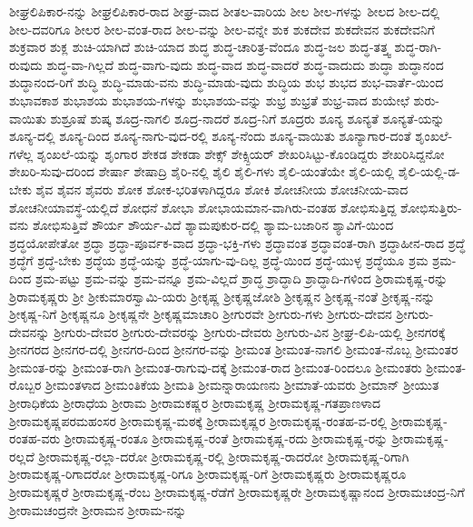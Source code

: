 {ಶೀಘ್ರಲಿಪಿಕಾರ-ನನ್ನು
ಶೀಘ್ರಲಿಪಿಕಾರ-ರಾದ
ಶೀಘ್ರ-ವಾದ
ಶೀತಲ-ವಾರಿಯ
ಶೀಲ
ಶೀಲ-ಗಳನ್ನು
ಶೀಲದ
ಶೀಲ-ದಲ್ಲಿ
ಶೀಲ-ದವರಿಗೂ
ಶೀಲರ
ಶೀಲ-ವಂತ-ರಾದ
ಶೀಲ-ವನ್ನು
ಶೀಲ-ವನ್ನೇ
ಶುಕ
ಶುಕದೇವ
ಶುಕದೇವನ
ಶುಕದೇವನಿಗೆ
ಶುಕ್ರವಾರ
ಶುಕ್ಲ
ಶುಚಿ-ಯಾಗಿದೆ
ಶುಚಿ-ಯಾದ
ಶುದ್ಧ
ಶುದ್ಧ-ಚಾರಿತ್ರ-ವೆಂದೂ
ಶುದ್ಧ-ಜಲ
ಶುದ್ಧ-ತತ್ತ್ವ
ಶುದ್ಧ-ರಾಗಿ-ರುವುದು
ಶುದ್ಧ-ವಾ-ಗಿಲ್ಲದೆ
ಶುದ್ಧ-ವಾಗು-ವುದು
ಶುದ್ಧ-ವಾದ
ಶುದ್ಧ-ವಾದರೆ
ಶುದ್ಧ-ವಾದುದು
ಶುದ್ಧಾ
ಶುದ್ಧಾನಂದ
ಶುದ್ಧಾನಂದ-ರಿಗೆ
ಶುದ್ಧಿ
ಶುದ್ಧಿ-ಮಾಡು-ವನು
ಶುದ್ಧಿ-ಮಾಡು-ವುದು
ಶುದ್ಧಿಯ
ಶುಭ
ಶುಭದ
ಶುಭ-ವಾರ್ತೆ-ಯಿಂದ
ಶುಭಾವಕಾಶ
ಶುಭಾಶಯ
ಶುಭಾಶಯ-ಗಳನ್ನು
ಶುಭಾಶಯ-ವನ್ನು
ಶುಭ್ರ
ಶುಭ್ರತೆ
ಶುಭ್ರ-ವಾದ
ಶುಯೇಛೆ
ಶುರು-ವಾಯಿತು
ಶುಶ್ರೂಷೆ
ಶುಷ್ಕ
ಶೂದ್ರ-ನಾಗಲಿ
ಶೂದ್ರ-ನಾದರೆ
ಶೂದ್ರ-ನಿಗೆ
ಶೂದ್ರರು
ಶೂನ್ಯ
ಶೂನ್ಯತೆ
ಶೂನ್ಯತೆ-ಯನ್ನು
ಶೂನ್ಯ-ದಲ್ಲಿ
ಶೂನ್ಯ-ದಿಂದ
ಶೂನ್ಯ-ನಾಗು-ವುದ-ರಲ್ಲಿ
ಶೂನ್ಯ-ನೆಂದು
ಶೂನ್ಯ-ವಾಯಿತು
ಶೂನ್ಯಾಗಾರ-ದಂತೆ
ಶೃಂಖಲೆ-ಗಳೆಲ್ಲ
ಶೃಂಖಲೆ-ಯನ್ನು
ಶೃಂಗಾರ
ಶೇಕಡ
ಶೇಕಡಾ
ಶೇಕ್ಸ್
ಶೇಕ್ಸ್ಪಿಯರ್
ಶೇಖರಿಸಿಟ್ಟು-ಕೊಂಡಿದ್ದರು
ಶೇಖರಿಸಿದ್ದನೋ
ಶೇಖರಿ-ಸುವು-ದರಿಂದ
ಶೇರ್ಷಾ
ಶೇಷಾದ್ರಿ
ಶೈರಿ-ನಲ್ಲಿ
ಶೈಲಿ
ಶೈಲಿ-ಗಳು
ಶೈಲಿ-ಯಂತೆಯೇ
ಶೈಲಿ-ಯಲ್ಲಿ
ಶೈಲಿ-ಯಲ್ಲಿ-ಡ-ಬೇಕು
ಶೈವ
ಶೈವನ
ಶೈವರು
ಶೋಕ
ಶೋಕ-ಭರಿತಳಾಗಿದ್ದರೂ
ಶೋಕಿ
ಶೋಚನೀಯ
ಶೋಚನೀಯ-ವಾದ
ಶೋಚನೀಯಾವಸ್ಥೆ-ಯಲ್ಲಿದೆ
ಶೋಧನೆ
ಶೋಭಾ
ಶೋಭಾಯಮಾನ-ವಾಗಿರು-ವಂತಹ
ಶೋಭಿಸುತ್ತಿದ್ದ
ಶೋಭಿಸುತ್ತಿರು-ವನು
ಶೋಭಿಸುತ್ತಿವೆ
ಶೌರ್ಯ
ಶೌರ್ಯ-ವಿದೆ
ಶ್ಯಾಮಪುಕುರ-ದಲ್ಲಿ
ಶ್ಯಾಮ-ಬಜಾರಿನ
ಶ್ಯಾವಿಗೆ-ಯಿಂದ
ಶ್ರದ್ಧಯೋಪೇತೋ
ಶ್ರದ್ಧಾ
ಶ್ರದ್ಧಾ-ಪೂರ್ವಕ-ವಾದ
ಶ್ರದ್ಧಾ-ಭಕ್ತಿ-ಗಳು
ಶ್ರದ್ಧಾವಂತ
ಶ್ರದ್ಧಾವಂತ-ರಾಗಿ
ಶ್ರದ್ಧಾಹೀನ-ರಾದ
ಶ್ರದ್ಧೆ
ಶ್ರದ್ಧೆಗೆ
ಶ್ರದ್ಧೆ-ಬೇಕು
ಶ್ರದ್ಧೆಯ
ಶ್ರದ್ಧೆ-ಯನ್ನು
ಶ್ರದ್ಧೆ-ಯಾಗು-ವು-ದಿಲ್ಲ
ಶ್ರದ್ಧೆ-ಯಿಂದ
ಶ್ರದ್ಧೆ-ಯುಳ್ಳ
ಶ್ರದ್ಧೆಯೂ
ಶ್ರಮ
ಶ್ರಮ-ದಿಂದ
ಶ್ರಮ-ಪಟ್ಟು
ಶ್ರಮ-ವನ್ನು
ಶ್ರಮ-ವನ್ನೂ
ಶ್ರಮ-ವಿಲ್ಲದೆ
ಶ್ರಾದ್ಧ
ಶ್ರಾದ್ಧಾದಿ
ಶ್ರಾದ್ಧಾದಿ-ಗಳಿಂದ
ಶ್ರಿರಾಮಕೃಷ್ಣ-ರನ್ನು
ಶ್ರಿರಾಮಕೃಷ್ಣರು
ಶ್ರೀ
ಶ್ರೀಕುಮಾರಸ್ವಾಮಿ-ಯರು
ಶ್ರೀಕೃಷ್ಣ
ಶ್ರೀಕೃಷ್ಣಜೋಶಿ
ಶ್ರೀಕೃಷ್ಣನ
ಶ್ರೀಕೃಷ್ಣ-ನಂತೆ
ಶ್ರೀಕೃಷ್ಣ-ನನ್ನು
ಶ್ರೀಕೃಷ್ಣ-ನಿಗೆ
ಶ್ರೀಕೃಷ್ಣನೂ
ಶ್ರೀಕೃಷ್ಣನೇ
ಶ್ರೀಕೃಷ್ಣಮಾಚಾರಿ
ಶ್ರೀಗುರವೇ
ಶ್ರೀಗುರು-ಗಳು
ಶ್ರೀಗುರು-ದೇವನ
ಶ್ರೀಗುರು-ದೇವನನ್ನು
ಶ್ರೀಗುರು-ದೇವರ
ಶ್ರೀಗುರು-ದೇವರನ್ನು
ಶ್ರೀಗುರು-ದೇವರು
ಶ್ರೀಗುರು-ವಿನ
ಶ್ರೀಘ್ರ-ಲಿಪಿ-ಯಲ್ಲಿ
ಶ್ರೀನಗರಕ್ಕೆ
ಶ್ರೀನಗರದ
ಶ್ರೀನಗರ-ದಲ್ಲಿ
ಶ್ರೀನಗರ-ದಿಂದ
ಶ್ರೀನಗರ-ವನ್ನು
ಶ್ರೀಮಂತ
ಶ್ರೀಮಂತ-ನಾಗಲಿ
ಶ್ರೀಮಂತ-ನೊಬ್ಬ
ಶ್ರೀಮಂತರ
ಶ್ರೀಮಂತ-ರನ್ನು
ಶ್ರೀಮಂತ-ರಾಗಿ
ಶ್ರೀಮಂತ-ರಾಗುವು-ದಕ್ಕೆ
ಶ್ರೀಮಂತ-ರಾದ
ಶ್ರೀಮಂತ-ರಿಂದಲೂ
ಶ್ರೀಮಂತರು
ಶ್ರೀಮಂತ-ರೊಬ್ಬರ
ಶ್ರೀಮಂತಳಾದ
ಶ್ರೀಮಂತಿಕೆಯ
ಶ್ರೀಮತಿ
ಶ್ರೀಮನ್ನಾರಾಯಣನು
ಶ್ರೀಮಾತೆ-ಯವರು
ಶ್ರೀಮಾನ್
ಶ್ರೀಯುತ
ಶ್ರೀರಾಧಿಕೆಯ
ಶ್ರೀರಾಧೆಯ
ಶ್ರೀರಾಮ
ಶ್ರೀರಾಮಕಷ್ಣರ
ಶ್ರೀರಾಮಕೃಷ್ಣ
ಶ್ರೀರಾಮಕೃಷ್ಣ-ಗತಪ್ರಾಣಳಾದ
ಶ್ರೀರಾಮಕೃಷ್ಣಪರಮಹಂಸರ
ಶ್ರೀರಾಮಕೃಷ್ಣ-ಮಠಕ್ಕೆ
ಶ್ರೀರಾಮಕೃಷ್ಣರ
ಶ್ರೀರಾಮಕೃಷ್ಣ-ರಂತಹ-ವ-ರಲ್ಲಿ
ಶ್ರೀರಾಮಕೃಷ್ಣ-ರಂತಹ-ವರು
ಶ್ರೀರಾಮಕೃಷ್ಣ-ರಂತೂ
ಶ್ರೀರಾಮಕೃಷ್ಣ-ರಂತೆ
ಶ್ರೀರಾಮಕೃಷ್ಣ-ರದು
ಶ್ರೀರಾಮಕೃಷ್ಣ-ರನ್ನು
ಶ್ರೀರಾಮಕೃಷ್ಣ-ರಲ್ಲದೆ
ಶ್ರೀರಾಮಕೃಷ್ಣ-ರಲ್ಲಾ-ದರೋ
ಶ್ರೀರಾಮಕೃಷ್ಣ-ರಲ್ಲಿ
ಶ್ರೀರಾಮಕೃಷ್ಣ-ರಾದರೋ
ಶ್ರೀರಾಮಕೃಷ್ಣ-ರಿಗಾಗಿ
ಶ್ರೀರಾಮಕೃಷ್ಣ-ರಿಗಾದರೋ
ಶ್ರೀರಾಮಕೃಷ್ಣ-ರಿಗೂ
ಶ್ರೀರಾಮಕೃಷ್ಣ-ರಿಗೆ
ಶ್ರೀರಾಮಕೃಷ್ಣರು
ಶ್ರೀರಾಮಕೃಷ್ಣರೂ
ಶ್ರೀರಾಮಕೃಷ್ಣರೆ
ಶ್ರೀರಾಮಕೃಷ್ಣ-ರೆಂಬ
ಶ್ರೀರಾಮಕೃಷ್ಣ-ರೆಡೆಗೆ
ಶ್ರೀರಾಮಕೃಷ್ಣರೇ
ಶ್ರೀರಾಮಕೃಷ್ಣಾನಂದ
ಶ್ರೀರಾಮಚಂದ್ರ-ನಿಗೆ
ಶ್ರೀರಾಮಚಂದ್ರನೇ
ಶ್ರೀರಾಮನ
ಶ್ರೀರಾಮ-ನನ್ನು
}
